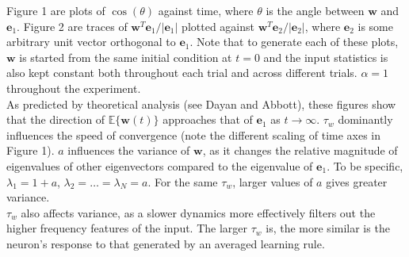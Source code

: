 \documentclass[12pt]{article}
\begin{document}
\begin{figure}[ht]
  \vspace{0.6cm}
  
  \caption{}
  
\end{figure}

Figure 1 are plots of $\cos(\theta)$ against time, where $\theta$ is the angle between $\boldsymbol{w}$ and $\boldsymbol{e}_1$. Figure 2 are traces of $\boldsymbol{w}^T\boldsymbol{e}_1/|\boldsymbol{e}_1|$ plotted against $\boldsymbol{w}^T\boldsymbol{e}_2/|\boldsymbol{e}_2|$, where $\boldsymbol{e}_2$ is some arbitrary unit vector orthogonal to $\boldsymbol{e}_1$.  Note that to generate each of these plots, $\boldsymbol{w}$ is started from the same initial condition at $t=0$ and the input statistics is also kept constant both throughout each trial and across different trials. $\alpha = 1$ throughout the experiment.\\

As predicted by theoretical analysis (see Dayan and Abbott), these figures show that the direction of $\mathbb{E}\{\boldsymbol{w}(t)\} $ approaches that of $\boldsymbol{e}_1$ as $t \rightarrow \infty$. $\tau_w$ dominantly influences the speed of convergence (note the different scaling of time axes in Figure 1). $a$ influences the variance of $\boldsymbol{w}$, as it changes the relative magnitude of eigenvalues of other eigenvectors compared to the eigenvalue of $\boldsymbol{e}_1$. To be specific, $\lambda_1 = 1 + a$, $\lambda_2 = \dots = \lambda_N = a$. For the same $\tau_w$, larger values of $a$ gives greater variance.\\

$\tau_w$ also affects variance, as a slower dynamics more effectively filters out the higher frequency features of the input. The larger $\tau_w$ is, the more similar is the neuron's response to that generated by an averaged learning rule.
\end{document}
